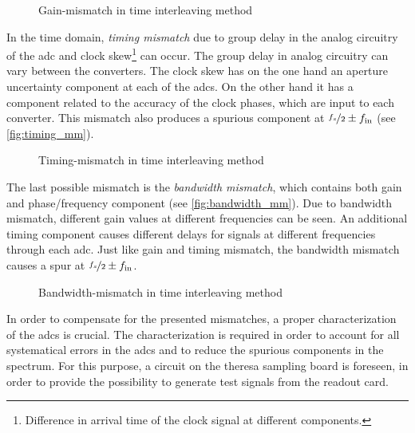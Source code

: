 \begin{figure}[H]
	\centering
	\resizebox{1\textwidth}{!}{}
	\caption{Gain-mismatch in time interleaving method \cite{Harris2019}}
	\label{fig:gain_mm}
\end{figure}

In the time domain, \textit{timing mismatch} due to group delay in the analog circuitry of the \gls{adc} and clock skew\footnote{Difference in arrival time of the clock signal at different components.} can occur. 
The group delay in analog circuitry can vary between the converters. 
The clock skew has on the one hand an aperture uncertainty component at each of the \glspl{adc}. 
On the other hand it has a component related to the accuracy of the clock phases, which are input to each converter. 
This mismatch also produces a spurious component at $\nicefrac{f_s}{2} \pm f_\text{in}$ (see \autoref{fig:timing_mm}). \cite{Harris2019} 

\begin{figure}[H]
	\centering
	\resizebox{1\textwidth}{!}{}
	\caption{Timing-mismatch in time interleaving method \cite{Harris2019}}
	\label{fig:timing_mm}
\end{figure}

The last possible mismatch is the \textit{bandwidth mismatch}, which contains both gain and phase/frequency component (see \autoref{fig:bandwidth_mm}). 
Due to bandwidth mismatch, different gain values at different frequencies can be seen. 
An additional timing component causes different delays for signals at different frequencies through each \gls{adc}. 
Just like gain and timing mismatch, the bandwidth mismatch causes a spur at $\nicefrac{f_s}{2} \pm f_\text{in}$.

\begin{figure}[H]
	\centering
	\resizebox{1\textwidth}{!}{}
	\caption{Bandwidth-mismatch in time interleaving method \cite{Harris2019}}
	\label{fig:bandwidth_mm}
\end{figure}

In order to compensate for the presented mismatches, a proper characterization of the \glspl{adc} is crucial. 
The characterization is required in order to account for all systematical errors in the \glspl{adc} and to reduce the spurious components in the spectrum.
For this purpose, a circuit on the \gls{theresa} sampling board is foreseen, in order to provide the possibility to generate test signals from the readout card.

